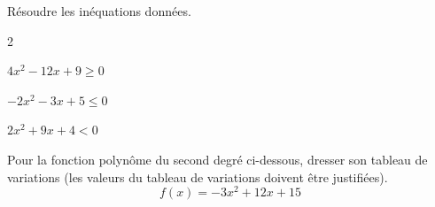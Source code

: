 \documentclass[12pt,a4paper]{article}  %
\begin{document}
Résoudre les inéquations données.
\begin{multicols}{2}
\begin{enumMet}
    \item $4x^2-12x+9\geqslant0$
    \item $-2x^{2}-3x+5 \leqslant 0$
    \item $2x^{2}+9 x+4 < 0$
\end{enumMet}
\end{multicols}

\vspace{-0.3cm}
Pour la fonction polynôme du second degré ci-dessous, dresser son tableau de variations (les valeurs du tableau de variations doivent être justifiées).
$$f(x)=-3x^2+12x+15$$
\end{document}
